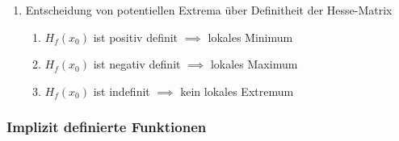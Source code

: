 \documentclass[twoside]{article}
\begin{document}
\begin{enumerate}[]
\begin{enumerate}[]
\begin{enumerate}[]
								\end{enumerate}
						\end{enumerate}
					\item Entscheidung von potentiellen Extrema über Definitheit der Hesse-Matrix
						\begin{enumerate}[]
							\item \begin{math} H_f(x_0) \end{math} ist positiv definit \begin{math} \implies \end{math}  lokales Minimum 
							\item \begin{math} H_f(x_0) \end{math} ist negativ definit \begin{math} \implies \end{math}  lokales Maximum
							\item \begin{math} H_f(x_0) \end{math} ist indefinit \begin{math} \implies \end{math}  kein lokales Extremum
						\end{enumerate}
				\end{enumerate}
			
			\subsubsection{Implizit definierte Funktionen}
			
\end{document}
